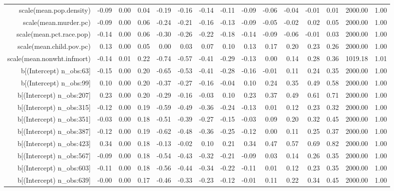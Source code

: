 \begin{table}[ht]
\begin{tabular}{rrrrrrrrrrrrrrr}
  scale(mean.pop.density) & -0.09 & 0.00 & 0.04 & -0.19 & -0.16 & -0.14 & -0.11 & -0.09 & -0.06 & -0.04 & -0.01 & 0.01 & 2000.00 & 1.00 \\ 
  scale(mean.murder.pc) & -0.09 & 0.00 & 0.06 & -0.24 & -0.21 & -0.16 & -0.13 & -0.09 & -0.05 & -0.02 & 0.02 & 0.05 & 2000.00 & 1.00 \\ 
  scale(mean.pct.race.pop) & -0.14 & 0.00 & 0.06 & -0.30 & -0.26 & -0.22 & -0.18 & -0.14 & -0.09 & -0.06 & -0.01 & 0.03 & 2000.00 & 1.00 \\ 
  scale(mean.child.pov.pc) & 0.13 & 0.00 & 0.05 & 0.00 & 0.03 & 0.07 & 0.10 & 0.13 & 0.17 & 0.20 & 0.23 & 0.26 & 2000.00 & 1.00 \\ 
  scale(mean.nonwht.infmort) & -0.14 & 0.01 & 0.22 & -0.74 & -0.57 & -0.41 & -0.29 & -0.13 & 0.00 & 0.14 & 0.28 & 0.36 & 1019.18 & 1.01 \\ 
  b[(Intercept) n\_obs:63] & -0.15 & 0.00 & 0.20 & -0.65 & -0.53 & -0.41 & -0.28 & -0.16 & -0.01 & 0.11 & 0.24 & 0.35 & 2000.00 & 1.00 \\ 
  b[(Intercept) n\_obs:99] & 0.10 & 0.00 & 0.20 & -0.37 & -0.27 & -0.16 & -0.04 & 0.10 & 0.24 & 0.35 & 0.49 & 0.58 & 2000.00 & 1.00 \\ 
  b[(Intercept) n\_obs:207] & 0.23 & 0.00 & 0.20 & -0.29 & -0.16 & -0.03 & 0.10 & 0.23 & 0.37 & 0.49 & 0.61 & 0.71 & 2000.00 & 1.00 \\ 
  b[(Intercept) n\_obs:315] & -0.12 & 0.00 & 0.19 & -0.59 & -0.49 & -0.36 & -0.24 & -0.13 & 0.01 & 0.12 & 0.23 & 0.32 & 2000.00 & 1.00 \\ 
  b[(Intercept) n\_obs:351] & -0.03 & 0.00 & 0.18 & -0.51 & -0.39 & -0.27 & -0.15 & -0.03 & 0.09 & 0.20 & 0.32 & 0.45 & 2000.00 & 1.00 \\ 
  b[(Intercept) n\_obs:387] & -0.12 & 0.00 & 0.19 & -0.62 & -0.48 & -0.36 & -0.25 & -0.12 & 0.00 & 0.11 & 0.25 & 0.37 & 2000.00 & 1.00 \\ 
  b[(Intercept) n\_obs:423] & 0.34 & 0.00 & 0.18 & -0.13 & -0.02 & 0.10 & 0.21 & 0.34 & 0.47 & 0.57 & 0.69 & 0.82 & 2000.00 & 1.00 \\ 
  b[(Intercept) n\_obs:567] & -0.09 & 0.00 & 0.18 & -0.54 & -0.43 & -0.32 & -0.21 & -0.09 & 0.03 & 0.14 & 0.26 & 0.35 & 2000.00 & 1.00 \\ 
  b[(Intercept) n\_obs:603] & -0.11 & 0.00 & 0.18 & -0.56 & -0.44 & -0.34 & -0.22 & -0.11 & 0.01 & 0.12 & 0.23 & 0.35 & 2000.00 & 1.00 \\ 
  b[(Intercept) n\_obs:639] & -0.00 & 0.00 & 0.17 & -0.46 & -0.33 & -0.23 & -0.12 & -0.01 & 0.11 & 0.22 & 0.34 & 0.45 & 2000.00 & 1.00 \\ 

\end{tabular}
\end{table}
